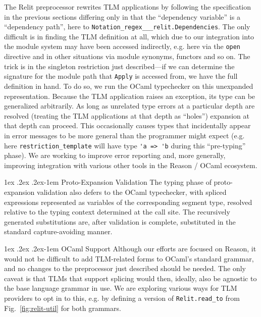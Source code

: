 \documentclass[acmsmall]{acmart}
\makeatletter
\renewcommand{\paragraph}{%
  \@startsection{paragraph}{4}%
  {\z@}{1ex \@plus .2ex \@minus .2ex}{-1em}%
  {\normalfont\normalsize\bfseries}%
}
\newcommand{\li}[1]{\lstinline[basicstyle=\ttfamily\fontsize{9pt}{1em}\selectfont]{#1}}
\makeatother
\begin{document}
The Relit preprocessor rewrites TLM applications by following the specification in the previous sections differing only in that the ``dependency variable'' is a ``dependency path'', here to \li{Notation_regex___relit.Dependencies}. The only difficult is in finding the TLM definition at all, which due to our integration into the module system may have been accessed indirectly, e.g. here via the \li{open} directive and in other situations via module synonyms, functors and so on. The trick is in the singleton restriction just described---if we can determine the signature for the module path that \li{Apply} is accessed from, we have the full definition in hand. To do so, we run the OCaml typechecker on this unexpanded representation. Because the TLM application raises an exception, its type can be generalized arbitrarily. As long as unrelated type errors at a particular depth are resolved (treating the TLM applications at that depth as ``holes'') expansion at that depth can proceed. This occasionally causes types that incidentally appear in error messages to be more general than the programmer might expect (e.g. here \li{restriction_template} will have type \li{'a => 'b} during this ``pre-typing'' phase). 
We are working to improve error reporting and, more generally, improving integration with various other tools in the Reason / OCaml ecosystem.

\paragraph{Proto-Expansion Validation} The typing phase of proto-expansion validation also defers to the OCaml typechecker, with spliced expressions  represented as variables of the corresponding segment type, resolved relative to the typing context determined at the call site. The recursively generated substitutions are, after validation is complete, substituted in the standard capture-avoiding manner.

\paragraph{OCaml Support} Although our efforts are focused on Reason, it would not be difficult to add TLM-related  forms to OCaml's standard grammar, and no changes to the preprocessor just described should be needed. The only caveat is that TLMs that support splicing would then, ideally, also be agnostic to the base language grammar in use. We are exploring various ways for TLM providers to opt in to this, e.g. by defining a version of \li{Relit.read_to} from Fig.~\ref{fig:relit-util} for both grammars.
\end{document}
